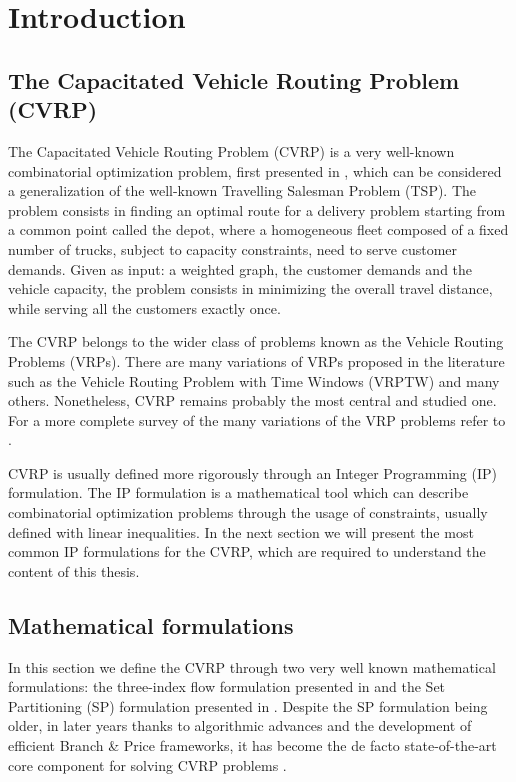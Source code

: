 \chapter{Introduction}

\section{The Capacitated Vehicle Routing Problem (CVRP)}
\label{sec:intro-cvrp-problem}

The Capacitated Vehicle Routing Problem (CVRP) is a very well-known combinatorial optimization problem,
first presented in \textcite{dantzig1959},
which can be considered a generalization of the well-known Travelling Salesman Problem (TSP).
The problem consists in finding an optimal route for a delivery problem
starting from a common point called the depot,
where a homogeneous fleet composed of a fixed number of trucks, subject to capacity constraints,
need to serve customer demands.
Given as input: a weighted graph, the customer demands and the vehicle capacity,
the problem consists in minimizing the overall travel distance,
while serving all the customers exactly once.

The CVRP belongs to the wider class of problems known as the Vehicle Routing Problems (VRPs).
There are many variations of VRPs proposed in the literature such as
the Vehicle Routing Problem with Time Windows (VRPTW) and many others.
Nonetheless, CVRP remains probably the most central and studied one.
For a more complete survey of the many variations of the VRP problems refer to \cite{poggi2014}.


CVRP is usually defined more rigorously through an Integer Programming (IP) formulation.
The IP formulation is a mathematical tool which can describe combinatorial optimization problems
through the usage of constraints, usually defined with linear inequalities.
In the next section we will present the most common IP formulations for the CVRP, which
are required to understand the content of this thesis.

\section{Mathematical formulations}
\label{sec:intro-cvrp-mathematical-formulations}


In this section we define the CVRP through two very well known mathematical formulations:
the three-index flow formulation presented in \textcite{toth2002} and
the Set Partitioning (SP) formulation presented in \textcite{balinski1964}.
Despite the SP formulation being older, in later years thanks to algorithmic advances
and the development of efficient Branch \& Price frameworks, it has become the de facto
state-of-the-art core component for solving CVRP problems \parencite{pessoa2020}.

